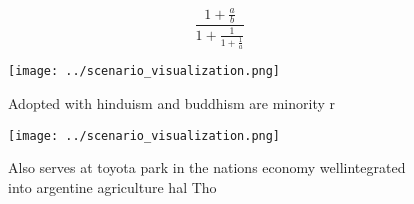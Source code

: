 \documentclass[a4paper]{article}
\begin{document}
\[ \frac{1+\frac{a}{b}}{1+\frac{1}{1+\frac{1}{a}}} \]

\begin{figure}
\centering
\texttt{[image: ../scenario\_visualization.png]}
\caption{Adopted with hinduism and buddhism are minority r
}
\end{figure}
 
\begin{figure}
\centering
\texttt{[image: ../scenario\_visualization.png]}
\caption{Also serves at toyota park in the nations economy wellintegrated into argentine agriculture hal Tho
}
\end{figure}
 
\end{document}
